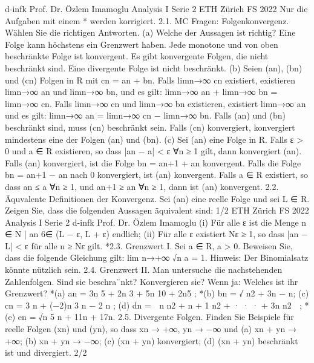 d-infk
Prof. Dr. Özlem Imamoglu
Analysis I
Serie 2
ETH Zürich
FS 2022
Nur die Aufgaben mit einem * werden korrigiert.
2.1. MC Fragen: Folgenkonvergenz. Wählen Sie die richtigen Antworten.
(a) Welche der Aussagen ist richtig?
 Eine Folge kann höchstens ein Grenzwert haben.
 Jede monotone und von oben beschränkte Folge ist konvergent.
 Es gibt konvergente Folgen, die nicht beschränkt sind.
 Eine divergente Folge ist nicht beschränkt.
(b) Seien (an), (bn) und (cn) Folgen in R mit cn = an + bn.
 Falls limn→∞ cn existiert, existieren limn→∞ an und limn→∞ bn, und es gilt:
limn→∞
an + limn→∞
bn = limn→∞
cn.
 Falls limn→∞ cn und limn→∞ bn existieren, existiert limn→∞ an und es gilt:
limn→∞
an = limn→∞
cn − limn→∞
bn.
 Falls (an) und (bn) beschränkt sind, muss (cn) beschränkt sein.
 Falls (cn) konvergiert, konvergiert mindestens eine der Folgen (an) und
(bn).
(c) Sei (an) eine Folge in R.
 Falls ε > 0 und a ∈ R existieren, so dass
|an − a| < ε ∀n ≥ 1
gilt, dann konvergiert (an).
 Falls (an) konvergiert, ist die Folge bn = an+1 + an konvergent.
 Falls die Folge bn = an+1 − an nach 0 konvergiert, ist (an) konvergent.
 Falls a ∈ R existiert, so dass an ≤ a ∀n ≥ 1, und an+1 ≥ an ∀n ≥ 1, dann
ist (an) konvergent.
2.2. Äquvalente Definitionen der Konvergenz. Sei (an) eine reelle Folge und
sei L ∈ R. Zeigen Sie, dass die folgenden Aussagen äquivalent sind:
1/2            
ETH Zürich
FS 2022
Analysis I
Serie 2
d-infk
Prof. Dr. Özlem Imamoglu
(i) Für alle ε ist die Menge {n ∈ N | an 6∈ (L − ε, L + ε)} endlich;
(ii) Für alle ε existiert Nε ≥ 1, so dass |an − L| < ε für alle n ≥ Nε gilt.
*2.3. Grenzwert I. Sei a ∈ R, a > 0. Beweisen Sie, dass die folgende Gleichung
gilt:
lim n→+∞
√n
a = 1.
Hinweis: Der Binomialsatz könnte nützlich sein.
2.4. Grenzwert II. Man untersuche die nachstehenden Zahlenfolgen. Sind sie
beschra¨nkt? Konvergieren sie? Wenn ja: Welches ist ihr Grenzwert?
*(a) an =
3n
5 + 2n
3 + 5n
10 + 2n5
;
*(b) bn =
√
n2 + 3n − n;
(c) cn =
3
n + (−2)n
3
n − 2
n
;
(d) dn =

n
n2
+
n + 1
n2
+ · · · +
3n
n2

;
*(e) en =
√n
5
n + 11n + 17n.
2.5. Divergente Folgen. Finden Sie Beispiele für reelle Folgen (xn) und (yn), so
dass xn → +∞, yn → −∞ und
(a) xn + yn → +∞;
(b) xn + yn → −∞;
(c) (xn + yn) konvergiert;
(d) (xn + yn) beschränkt ist und divergiert.
2/2
